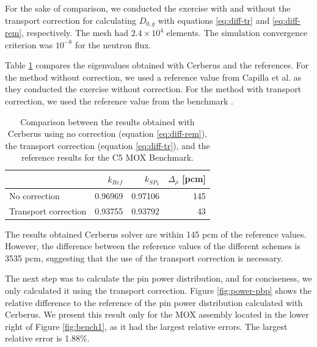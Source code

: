\documentclass{anstrans}
\begin{document}
For the sake of comparison, we conducted the exercise with and without the transport correction for calculating $D_{0,g}$ with equations \ref{eq:diff-tr} and \ref{eq:diff-rem}, respectively.
The mesh had $2.4 \times 10^{4}$ elements.
The simulation convergence criterion was $10^{-8}$ for the neutron flux.

Table \ref{tab:keff-2nd} compares the eigenvalues obtained with Cerberus and the references.
For the method without correction, we used a reference value from Capilla et al. \cite{capilla_applications_2009} as they conducted the exercise without correction.
For the method with transport correction, we used the reference value from the benchmark \cite{cavarec_benchmark_1994}.
\begin{table}[htbp!]
	\centering
	\caption{Comparison between the results obtained with Cerberus using no correction (equation \ref{eq:diff-rem}), the transport correction (equation \ref{eq:diff-tr}), and the reference results for the C5 MOX Benchmark.}
	\label{tab:keff-2nd}
	\begin{tabular}{lrrr}
	\toprule
							& $k_{Ref}$ & $k_{SP_3}$	& $\Delta_{\rho}$ [pcm]	\\
	\midrule
	No correction			& 0.96969	& 0.97106		& 145				\\
	Transport correction	& 0.93755	& 0.93792		& 43				\\
	\bottomrule
	\end{tabular}
\end{table}

The results obtained Cerberus solver are within 145 pcm of the reference values.
However, the difference between the reference values of the different schemes is 3535 pcm, suggesting that the use of the transport correction is necessary.

The next step was to calculate the pin power distribution, and for conciseness, we only calculated it using the transport correction.
Figure \ref{fig:power-pbp} shows the relative difference to the reference of the pin power distribution calculated with Cerberus.
We present this result only for the MOX assembly located in the lower right of Figure \ref{fig:bench1}, as it had the largest relative errors.
The largest relative error is 1.88\%.
\end{document}
